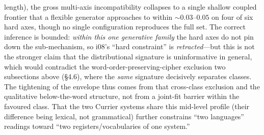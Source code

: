 \documentclass[11pt]{article}
\begin{document}
length), the gross multi-axis incompatibility collapses to a single shallow coupled frontier
that a flexible generator approaches to within $\sim\!0.03$--$0.05$ on four of six hard axes,
though no single configuration reproduces the full set. The correct inference is bounded:
\emph{within this one generative family} the hard axes do not pin down the sub-mechanism, so
i08's ``hard constraint'' is \emph{retracted}---but this is not the stronger claim that the
distributional signature is uninformative in general, which would contradict the
word-order-preserving-cipher exclusion two subsections above (\S4.6), where the \emph{same} signature
decisively separates classes. The tightening of the envelope thus comes from that
cross-class exclusion and the qualitative below-the-word structure, not from a joint-fit
barrier within the favoured class. That the two Currier systems share this mid-level profile
(their difference being lexical, not grammatical) further constrains ``two languages''
readings toward ``two registers/vocabularies of one system.''
\end{document}
